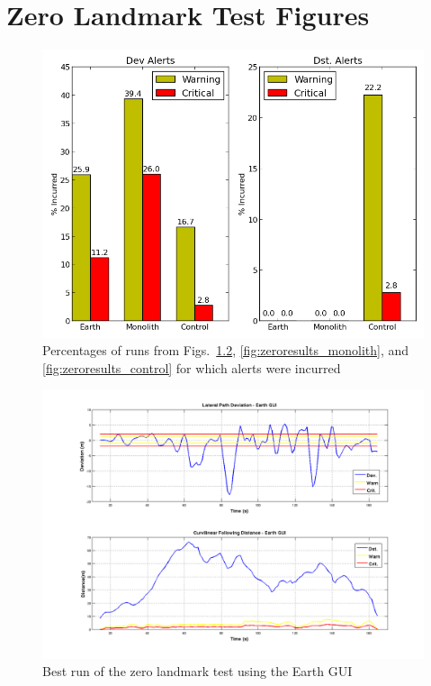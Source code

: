 \chapter{Zero Landmark Test Figures} \label{app:zeroresults}


\begin{figure}[ht] \centering
    \includegraphics[width=6.5in]{./figs/zero_landmark_alert_percents.png}
    \caption{Percentages of runs from Figs.~\ref{fig:zeroresults_earth}, \ref{fig:zeroresults_monolith}, and \ref{fig:zeroresults_control} for which alerts were incurred}
    \label{fig:zero_alerts}
\end{figure}


\begin{figure}[ht] \centering
    \includegraphics[width=5.5in]{./figs/zero_landmark_results_dst_dev_earth.png}
    \caption{Best run of the zero landmark test using the Earth GUI} \label{fig:zeroresults_earth}
\end{figure}

